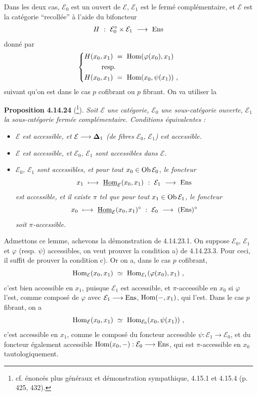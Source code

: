 Dans les deux cas, $\mathcal{E}_0$ est un ouvert de $\mathcal{E}$, $\mathcal{E}_1$ est le fermé complémentaire, et $\mathcal{E}$ est la catégorie “recollée” à l'aide du bifoncteur
\[
H\ :\ \mathcal{E}_0^{\circ}\times\mathcal{E}_1\ \longrightarrow\ \Ens
\]
donné par
\[
\left\{
\begin{aligned}
H(x_0,x_1)\ &=\ \Hom(\varphi(x_0),x_1)\\
&\hspace{-2em}\text{resp.}\\
H(x_0,x_1)\ &=\ \Hom(x_0,\psi(x_1))\ ,
\end{aligned}
\right.
\]
suivant qu'on est dans le cas $p$ cofibrant ou $p$ fibrant. On va utiliser la

\textbf{Proposition 4.14.24} (\footnote[173]{cf. énoncés plus généraux et démonstration sympathique, 4.15.1 et 4.15.4 (p. 425, 432).}). \textit{Soit $\mathcal{E}$ une catégorie, $\mathcal{E}_0$ une sous-catégorie ouverte, $\mathcal{E}_1$ la sous-catégorie fermée complémentaire. Conditions équivalentes :}
\begin{itemize}[leftmargin=*]
\item[\textit{a)}] \textit{$\mathcal{E}$ est accessible, et $\mathcal{E}\longrightarrow\boldsymbol{\Delta}_1$ (de fibres $\mathcal{E}_0$, $\mathcal{E}_1$) est accessible.}
\item[\textit{b)}] \textit{$\mathcal{E}$ est accessible, et $\mathcal{E}_0$, $\mathcal{E}_1$ sont accessibles dans $\mathcal{E}$.}
\item[\textit{c)}] \textit{$\mathcal{E}_0$, $\mathcal{E}_1$ sont accessibles, et pour tout $x_0\in\operatorname{Ob}\mathcal{E}_0$, le foncteur}
\[
x_1\ \longmapsto\ \uHom_{\mathcal{E}}(x_0,x_1)\ :\ \mathcal{E}_1\ \longrightarrow\ \Ens
\]
\textit{est accessible, et il existe $\pi$ tel que pour tout $x_1\in\operatorname{Ob}\mathcal{E}_1$, le foncteur}
\[
x_0\ \longmapsto\ \uHom_{\mathcal{E}}(x_0,x_1)^{\circ}\ :\ \mathcal{E}_0\ \longrightarrow\ (\Ens)^{\circ}
\]
\textit{soit $\pi$-accessible.}
\end{itemize}

Admettons ce lemme, achevons la démonstration de 4.14.23.1. On suppose $\mathcal{E}_0$, $\mathcal{E}_1$ et $\varphi$ (resp. $\psi$) accessibles, on veut prouver la condition a) de 4.14.23.3. Pour ceci, il suffit de prouver la condition c). Or on a, dans le cas $p$ cofibrant, %
\[
\Hom_{\mathcal{E}}(x_0,x_1)\ \simeq\ \Hom_{\mathcal{E}_1}(\varphi(x_0),x_1)\ ,
\]
c'est bien accessible en $x_1$, puisque $\mathcal{E}_1$ est accessible, et $\pi$-accessible en $x_0$ si $\varphi$ l'est, comme composé de $\varphi$ avec $\mathcal{E}_1\longrightarrow\mathrm{Ens}$, $\operatorname{Hom}(-,x_1)$, qui l'est. Dans le cas $p$ fibrant, on a
\[
\Hom_{\mathcal{E}}(x_0,x_1)\ \simeq\ \Hom_{\mathcal{E}_0}(x_0,\psi(x_1))\ ,
\]
c'est accessible en $x_1$, comme le composé du foncteur accessible $\psi:\mathcal{E}_1\longrightarrow\mathcal{E}_0$, et du foncteur également accessible $\operatorname{Hom}(x_0,-):\mathcal{E}_0\longrightarrow\mathrm{Ens}$, qui est $\pi$-accessible en $x_0$ tautologiquement.

